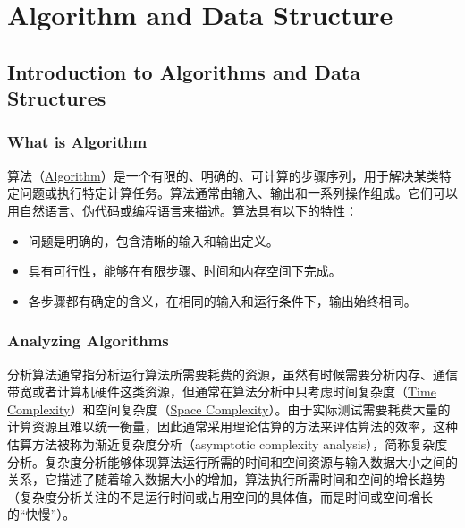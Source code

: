\part{Algorithm and Data Structure}
\chapter{Introduction to Algorithms and Data Structures}
\section{What is Algorithm}
算法（\href{https://en.wikipedia.org/wiki/Algorithm}{Algorithm}）是一个有限的、明确的、可计算的步骤序列，用于解决某类特定问题或执行特定计算任务\cite{cormenIntroductionAlgorithms2009}。算法通常由输入、输出和一系列操作组成。它们可以用自然语言、伪代码或编程语言来描述。算法具有以下的特性：

\begin{itemize}
    \item 问题是明确的，包含清晰的输入和输出定义。
    \item 具有可行性，能够在有限步骤、时间和内存空间下完成。
    \item 各步骤都有确定的含义，在相同的输入和运行条件下，输出始终相同。
\end{itemize}

\section{Analyzing Algorithms}
分析算法通常指分析运行算法所需要耗费的资源，虽然有时候需要分析内存、通信带宽或者计算机硬件这类资源，但通常在算法分析中只考虑时间复杂度（\href{https://www.wikiwand.com/en/articles/Time_complexity}{Time Complexity}）和空间复杂度（\href{https://www.wikiwand.com/en/articles/Space_complexity}{Space Complexity}）。由于实际测试需要耗费大量的计算资源且难以统一衡量，因此通常采用理论估算的方法来评估算法的效率，这种估算方法被称为渐近复杂度分析（asymptotic complexity analysis），简称复杂度分析。复杂度分析能够体现算法运行所需的时间和空间资源与输入数据大小之间的关系，它描述了随着输入数据大小的增加，算法执行所需时间和空间的增长趋势（复杂度分析关注的不是运行时间或占用空间的具体值，而是时间或空间增长的“快慢”）。


